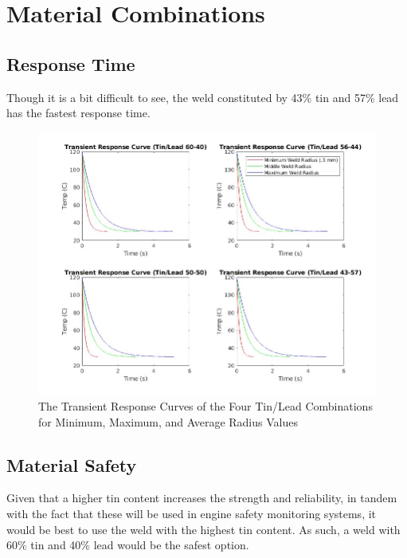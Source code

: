 \documentclass[letterpaper,11pt]{texMemo} %
\begin{document}
\section*{Material Combinations}

\subsection*{Response Time}

Though it is a bit difficult to see, the weld constituted by 43\% tin and 57\% lead has the fastest response time.

\begin{figure}[H]
  \centering
  \includegraphics[width=.9\textwidth]{4TRC.jpg}
  \caption{The Transient Response Curves of the Four Tin/Lead Combinations for Minimum, Maximum, and Average Radius Values}
  \label{fig:2}
\end{figure}

\subsection*{Material Safety}

Given that a higher tin content increases the strength and reliability, in tandem with the fact that these will be used in engine safety monitoring systems, it would be best to use the weld with the highest tin content. As such, a weld with 60\% tin and 40\% lead would be the safest option.
\end{document}
